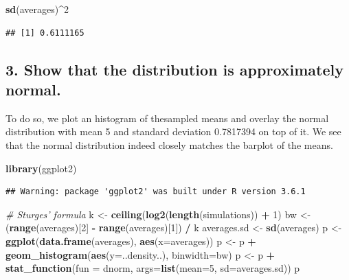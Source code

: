 \documentclass[]{article}
\newenvironment{Shaded}{\begin{snugshade}}{\end{snugshade}}
\newcommand{\CommentTok}[1]{\textcolor[rgb]{0.56,0.35,0.01}{\textit{#1}}}
\newcommand{\DataTypeTok}[1]{\textcolor[rgb]{0.13,0.29,0.53}{#1}}
\newcommand{\DecValTok}[1]{\textcolor[rgb]{0.00,0.00,0.81}{#1}}
\newcommand{\KeywordTok}[1]{\textcolor[rgb]{0.13,0.29,0.53}{\textbf{#1}}}
\newcommand{\NormalTok}[1]{#1}
\newcommand{\OperatorTok}[1]{\textcolor[rgb]{0.81,0.36,0.00}{\textbf{#1}}}
\newcommand{\StringTok}[1]{\textcolor[rgb]{0.31,0.60,0.02}{#1}}
\begin{document}
\begin{Shaded}
\begin{Highlighting}[]
\KeywordTok{sd}\NormalTok{(averages)}\OperatorTok{^}\DecValTok{2}
\end{Highlighting}
\end{Shaded}

\begin{verbatim}
## [1] 0.6111165
\end{verbatim}

\hypertarget{show-that-the-distribution-is-approximately-normal.}{%
\subsection{3. Show that the distribution is approximately
normal.}\label{show-that-the-distribution-is-approximately-normal.}}

To do so, we plot an histogram of thesampled means and overlay the
normal distribution with mean 5 and standard deviation 0.7817394 on top
of it. We see that the normal distribution indeed closely matches the
barplot of the means.

\begin{Shaded}
\begin{Highlighting}[]
\KeywordTok{library}\NormalTok{(ggplot2)}
\end{Highlighting}
\end{Shaded}

\begin{verbatim}
## Warning: package 'ggplot2' was built under R version 3.6.1
\end{verbatim}

\begin{Shaded}
\begin{Highlighting}[]
\CommentTok{# Sturges' formula}
\NormalTok{k <-}\StringTok{ }\KeywordTok{ceiling}\NormalTok{(}\KeywordTok{log2}\NormalTok{(}\KeywordTok{length}\NormalTok{(simulations)) }\OperatorTok{+}\StringTok{ }\DecValTok{1}\NormalTok{)}
\NormalTok{bw <-}\StringTok{ }\NormalTok{(}\KeywordTok{range}\NormalTok{(averages)[}\DecValTok{2}\NormalTok{] }\OperatorTok{-}\StringTok{ }\KeywordTok{range}\NormalTok{(averages)[}\DecValTok{1}\NormalTok{]) }\OperatorTok{/}\StringTok{ }\NormalTok{k}
\NormalTok{averages.sd <-}\StringTok{ }\KeywordTok{sd}\NormalTok{(averages)}
\NormalTok{p <-}\StringTok{ }\KeywordTok{ggplot}\NormalTok{(}\KeywordTok{data.frame}\NormalTok{(averages), }\KeywordTok{aes}\NormalTok{(}\DataTypeTok{x=}\NormalTok{averages))}
\NormalTok{p <-}\StringTok{ }\NormalTok{p }\OperatorTok{+}\StringTok{ }\KeywordTok{geom_histogram}\NormalTok{(}\KeywordTok{aes}\NormalTok{(}\DataTypeTok{y=}\NormalTok{..density..), }\DataTypeTok{binwidth=}\NormalTok{bw)}
\NormalTok{p <-}\StringTok{ }\NormalTok{p }\OperatorTok{+}\StringTok{ }\KeywordTok{stat_function}\NormalTok{(}\DataTypeTok{fun =}\NormalTok{ dnorm, }\DataTypeTok{args=}\KeywordTok{list}\NormalTok{(}\DataTypeTok{mean=}\DecValTok{5}\NormalTok{, }\DataTypeTok{sd=}\NormalTok{averages.sd))}
\NormalTok{p}
\end{Highlighting}
\end{Shaded}
\end{document}
